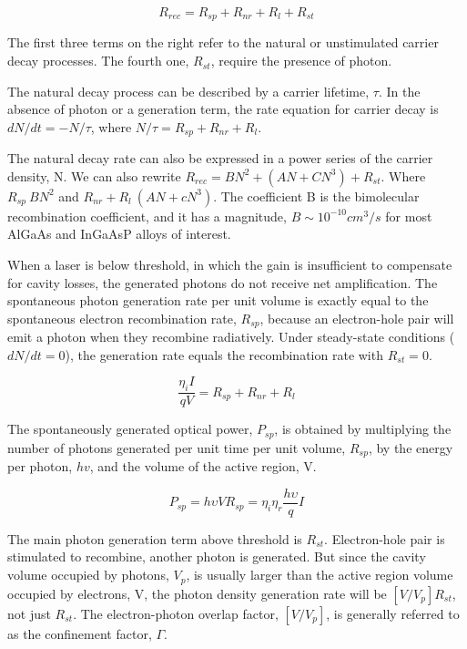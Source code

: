 \begin{equation}
  R_{rec} = R_{sp} + R_{nr} + R_{l} + R_{st}
\end{equation}

The first three terms on the right refer to the natural or unstimulated carrier
decay processes. The fourth one, $R_{st}$, require the presence of photon.

The natural decay process can be described by a carrier lifetime, $\tau$. In
the absence of photon or a generation term, the rate equation for carrier decay
is $dN/dt = -N/\tau$, where $N/\tau = R_{sp} + R_{nr} + R_{l}$.

The natural decay rate can also be expressed in a power series of the carrier
density, N. We can also rewrite $R_{rec} = BN^2 + (AN + CN^3) + R_{st}$.  Where
$R_{sp} ~ BN^2$ and $R_{nr} + R_{l} ~ (AN + cN^3)$. The coefficient B is the
bimolecular recombination coefficient, and it has a magnitude, $B \sim 10^{-10}
cm^3/s$ for most AlGaAs and InGaAsP alloys of interest.

When a laser is below threshold, in which the gain is insufficient to
compensate for cavity losses, the generated photons do not receive net
amplification. The spontaneous photon generation rate per unit volume is
exactly equal to the spontaneous electron recombination rate, $R_{sp}$, because
an electron-hole pair will emit a photon when they recombine radiatively.
Under steady-state conditions ($dN/dt = 0$), the generation rate equals the
recombination rate with $R_{st} = 0$.

\begin{equation}
  \frac{\eta_{i}I}{qV} = R_{sp} + R_{nr} + R_{l}
\end{equation}

The spontaneously generated optical power, $P_{sp}$, is obtained by multiplying
the number of photons generated per unit time per unit volume, $R_{sp}$, by the
energy per photon, $hv$, and the volume of the active region, V.

\begin{equation}
  P_{sp} = h{\upsilon}VR_{sp} = \eta_i\eta_r\frac{h\upsilon}{q}I
\end{equation}

The main photon generation term above threshold is $R_{st}$. Electron-hole pair
is stimulated to recombine, another photon is generated. But since the cavity
volume occupied by photons, $V_p$, is usually larger than the active region
volume occupied by electrons, V, the photon density generation rate will be
$[V/V_p]R_{st}$, not just $R_{st}$. The electron-photon overlap factor,
$[V/V_p]$, is generally referred to as the confinement factor, $\Gamma$.

